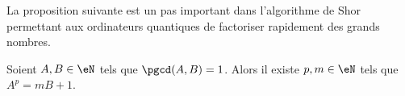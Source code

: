 La proposition suivante est un pas important dans l'algorithme de Shor permettant aux ordinateurs quantiques de factoriser rapidement des grands nombres\cite{BIBooBBRQooJxksHX}.

\begin{proposition}       \label{PROPooZCKXooOtocKE}
	Soient \( A,B\in \eN\) tels que \( \pgcd(A,B)=1\). Alors il existe \( p,m\in \eN\) tels que \( A^p=mB+1\).
\end{proposition}
